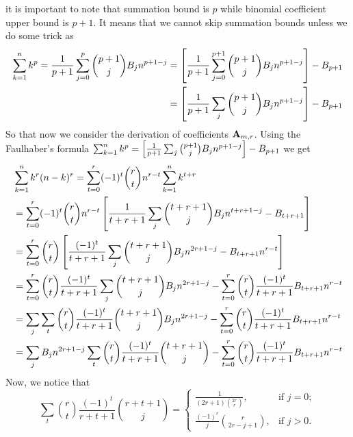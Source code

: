 it is important to note that summation bound is $p$ while binomial coefficient upper bound is $p+1$.
It means that we cannot skip summation bounds unless we do some trick as
\begin{equation*}
    \begin{split}
        \sum_{k=1}^{n} k^{p}
        = \frac{1}{p+1}\sum_{j=0}^{p} \binom{p+1}{j} {B}\sb{j} n^{p+1-j}
        &= \left[ \frac{1}{p+1}\sum_{j=0}^{p+1} \binom{p+1}{j} {B}\sb{j} n^{p+1-j} \right] - {B}\sb{p+1} \\
        &= \left[ \frac{1}{p+1}\sum_{j} \binom{p+1}{j} {B}\sb{j} n^{p+1-j} \right] - {B}\sb{p+1}
    \end{split}
\end{equation*}
So that now we consider the derivation of coefficients ${\mathbf{A}} \sb{m,r}$.
Using the Faulhaber's formula
$\sum_{k=1}^{n} k^{p} = \left[ \frac{1}{p+1}\sum_{j} \binom{p+1}{j} {B}\sb{j} n^{p+1-j} \right] - {B}\sb{p+1}$
we get
\begin{equation*}
    \begin{split}
        &\sum_{k=1}^{n} k^{r} (n-k)^{r}
        = \sum_{t=0}^{r} (-1)^t \binom{r}{t} n^{r-t} \sum_{k=1}^{n} k^{t+r} \\
        &= \sum_{t=0}^{r} (-1)^t \binom{r}{t} n^{r-t} \left[ \frac{1}{t+r+1} \sum_{j} \binom{t+r+1}{j} {B}\sb{j} n^{t+r+1-j} - {B}\sb{t+r+1} \right] \\
        &= \sum_{t=0}^{r} \binom{r}{t} \left[ \frac{(-1)^t}{t+r+1} \sum_{j} \binom{t+r+1}{j} {B}\sb{j} n^{2r+1-j} - {B}\sb{t+r+1} n^{r-t} \right] \\
        &= \sum_{t=0}^{r} \binom{r}{t} \frac{(-1)^t}{t+r+1} \sum_{j} \binom{t+r+1}{j} {B}\sb{j} n^{2r+1-j} - \sum_{t=0}^{r} \binom{r}{t} \frac{(-1)^t}{t+r+1} {B}\sb{t+r+1} n^{r-t} \\
        &= \sum_{j} \sum_{t} \binom{r}{t} \frac{(-1)^t}{t+r+1} \binom{t+r+1}{j} {B}\sb{j} n^{2r+1-j} - \sum_{t=0}^{r} \binom{r}{t} \frac{(-1)^t}{t+r+1} {B}\sb{t+r+1} n^{r-t} \\
        &= \sum_{j} {B}\sb{j} n^{2r+1-j} \sum_{t} \binom{r}{t} \frac{(-1)^t}{t+r+1} \binom{t+r+1}{j} - \sum_{t=0}^{r} \binom{r}{t} \frac{(-1)^t}{t+r+1} {B}\sb{t+r+1} n^{r-t}
    \end{split}
\end{equation*}
Now, we notice that
\begin{equation}
    \sum_{t} \binom{r}{t} \frac{(-1)^t}{r+t+1} \binom{r+t+1}{j}
    =\begin{cases}
         \frac{1}{(2r+1) \binom{2r}r}, & \text{if } j=0;\\
         \frac{(-1)^r}{j} \binom{r}{2r-j+1}, & \text{if } j>0.
    \end{cases}\label{eq:combinatorial-identity}
\end{equation}
